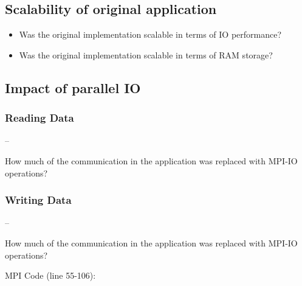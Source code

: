 \documentclass[9pt,pdftex,xcolor=dvipsnames]{beamer}
\begin{document}
\subsection{Scalability of original application}
\begin{frame}{\insertsubsection}
\begin{itemize}
\item Was the original implementation scalable in terms of IO performance?
\item Was the original implementation scalable in terms of RAM storage?
\end{itemize}
\end{frame}


\subsection{Impact of parallel IO}

\subsubsection{Reading Data}
\begin{frame}[fragile]{\insertsubsection--\insertsubsubsection}
\begin{overlayarea}{\textheight}{\textwidth}
How much of the communication in the application was replaced with MPI-IO operations? \\
\end{overlayarea}
\end{frame}

\subsubsection{Writing Data}
\begin{frame}[fragile]{\insertsubsection--\insertsubsubsection}
\begin{overlayarea}{\textheight}{\textwidth}
How much of the communication in the application was replaced with MPI-IO operations? \\
\begin{block}{MPI Code (line 55-106):}
\ioMPICodeWrite
\end{block}
\end{overlayarea}
\end{frame}
\end{document}
